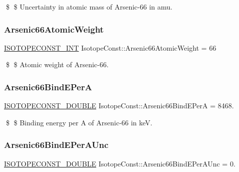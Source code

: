 \$ \$ Uncertainty in atomic mass of Arsenic-\/66 in amu. \mbox{\label{group___isotope_const-_arsenic-_as66_gae041fc271932abf298944536176e4bf6}} 
\subsubsection{\texorpdfstring{Arsenic66\+Atomic\+Weight}{Arsenic66AtomicWeight}}
{\footnotesize\ttfamily \mbox{\hyperlink{group___isotope_const-_macros_ga5f18360b3e99483a35c32d789e62621c}{I\+S\+O\+T\+O\+P\+E\+C\+O\+N\+S\+T\+\_\+\+I\+NT}} Isotope\+Const\+::\+Arsenic66\+Atomic\+Weight = 66}

\$ \$ Atomic weight of Arsenic-\/66. \mbox{\label{group___isotope_const-_arsenic-_as66_ga9ac1b542e0620e6e8a99927200d6ab09}} 
\subsubsection{\texorpdfstring{Arsenic66\+Bind\+E\+PerA}{Arsenic66BindEPerA}}
{\footnotesize\ttfamily \mbox{\hyperlink{group___isotope_const-_macros_ga8f45a7272ce02c0b4c65c44636ed719a}{I\+S\+O\+T\+O\+P\+E\+C\+O\+N\+S\+T\+\_\+\+D\+O\+U\+B\+LE}} Isotope\+Const\+::\+Arsenic66\+Bind\+E\+PerA = 8468.}

\$ \$ Binding energy per A of Arsenic-\/66 in keV. \mbox{\label{group___isotope_const-_arsenic-_as66_gafa8163f1dac5312111a73cfe6764de3d}} 
\subsubsection{\texorpdfstring{Arsenic66\+Bind\+E\+Per\+A\+Unc}{Arsenic66BindEPerAUnc}}
{\footnotesize\ttfamily \mbox{\hyperlink{group___isotope_const-_macros_ga8f45a7272ce02c0b4c65c44636ed719a}{I\+S\+O\+T\+O\+P\+E\+C\+O\+N\+S\+T\+\_\+\+D\+O\+U\+B\+LE}} Isotope\+Const\+::\+Arsenic66\+Bind\+E\+Per\+A\+Unc = 0.}


